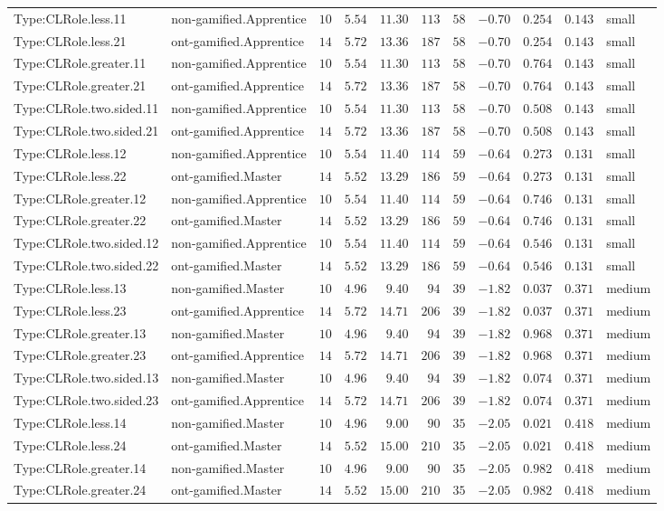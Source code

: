 \documentclass[6pt,a4paper]{article}
\begin{document}
{\begin{longtable}{llrrrrrrrrl}
Type:CLRole.less.11&non-gamified.Apprentice&$10$&$5.54$&$11.30$&$113$&$ 58$&$-0.70$&$0.254$&$0.143$&small\tabularnewline
Type:CLRole.less.21&ont-gamified.Apprentice&$14$&$5.72$&$13.36$&$187$&$ 58$&$-0.70$&$0.254$&$0.143$&small\tabularnewline
Type:CLRole.greater.11&non-gamified.Apprentice&$10$&$5.54$&$11.30$&$113$&$ 58$&$-0.70$&$0.764$&$0.143$&small\tabularnewline
Type:CLRole.greater.21&ont-gamified.Apprentice&$14$&$5.72$&$13.36$&$187$&$ 58$&$-0.70$&$0.764$&$0.143$&small\tabularnewline
Type:CLRole.two.sided.11&non-gamified.Apprentice&$10$&$5.54$&$11.30$&$113$&$ 58$&$-0.70$&$0.508$&$0.143$&small\tabularnewline
Type:CLRole.two.sided.21&ont-gamified.Apprentice&$14$&$5.72$&$13.36$&$187$&$ 58$&$-0.70$&$0.508$&$0.143$&small\tabularnewline
Type:CLRole.less.12&non-gamified.Apprentice&$10$&$5.54$&$11.40$&$114$&$ 59$&$-0.64$&$0.273$&$0.131$&small\tabularnewline
Type:CLRole.less.22&ont-gamified.Master&$14$&$5.52$&$13.29$&$186$&$ 59$&$-0.64$&$0.273$&$0.131$&small\tabularnewline
Type:CLRole.greater.12&non-gamified.Apprentice&$10$&$5.54$&$11.40$&$114$&$ 59$&$-0.64$&$0.746$&$0.131$&small\tabularnewline
Type:CLRole.greater.22&ont-gamified.Master&$14$&$5.52$&$13.29$&$186$&$ 59$&$-0.64$&$0.746$&$0.131$&small\tabularnewline
Type:CLRole.two.sided.12&non-gamified.Apprentice&$10$&$5.54$&$11.40$&$114$&$ 59$&$-0.64$&$0.546$&$0.131$&small\tabularnewline
Type:CLRole.two.sided.22&ont-gamified.Master&$14$&$5.52$&$13.29$&$186$&$ 59$&$-0.64$&$0.546$&$0.131$&small\tabularnewline
Type:CLRole.less.13&non-gamified.Master&$10$&$4.96$&$ 9.40$&$ 94$&$ 39$&$-1.82$&$0.037$&$0.371$&medium\tabularnewline
Type:CLRole.less.23&ont-gamified.Apprentice&$14$&$5.72$&$14.71$&$206$&$ 39$&$-1.82$&$0.037$&$0.371$&medium\tabularnewline
Type:CLRole.greater.13&non-gamified.Master&$10$&$4.96$&$ 9.40$&$ 94$&$ 39$&$-1.82$&$0.968$&$0.371$&medium\tabularnewline
Type:CLRole.greater.23&ont-gamified.Apprentice&$14$&$5.72$&$14.71$&$206$&$ 39$&$-1.82$&$0.968$&$0.371$&medium\tabularnewline
Type:CLRole.two.sided.13&non-gamified.Master&$10$&$4.96$&$ 9.40$&$ 94$&$ 39$&$-1.82$&$0.074$&$0.371$&medium\tabularnewline
Type:CLRole.two.sided.23&ont-gamified.Apprentice&$14$&$5.72$&$14.71$&$206$&$ 39$&$-1.82$&$0.074$&$0.371$&medium\tabularnewline
Type:CLRole.less.14&non-gamified.Master&$10$&$4.96$&$ 9.00$&$ 90$&$ 35$&$-2.05$&$0.021$&$0.418$&medium\tabularnewline
Type:CLRole.less.24&ont-gamified.Master&$14$&$5.52$&$15.00$&$210$&$ 35$&$-2.05$&$0.021$&$0.418$&medium\tabularnewline
Type:CLRole.greater.14&non-gamified.Master&$10$&$4.96$&$ 9.00$&$ 90$&$ 35$&$-2.05$&$0.982$&$0.418$&medium\tabularnewline
Type:CLRole.greater.24&ont-gamified.Master&$14$&$5.52$&$15.00$&$210$&$ 35$&$-2.05$&$0.982$&$0.418$&medium\tabularnewline

\end{longtable}}
\end{document}
